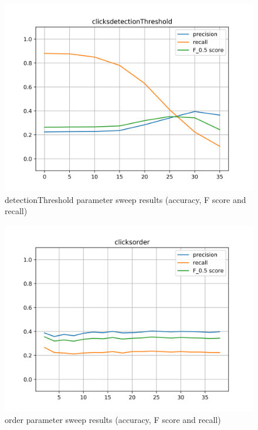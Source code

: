 \begin{figure}[!ht]
	\includegraphics[clip,width=\columnwidth]{Figures/clicksdetectionThreshold.png}%
	\caption{detectionThreshold parameter sweep results (accuracy, F score and recall)}
	\label{fig:accomp}
\end{figure}

\begin{figure}[!ht]
	\includegraphics[clip,width=\columnwidth]{Figures/clicksorder.png}%
	\caption{order parameter sweep results (accuracy, F score and recall)}
	\label{fig:accomp}
\end{figure}

